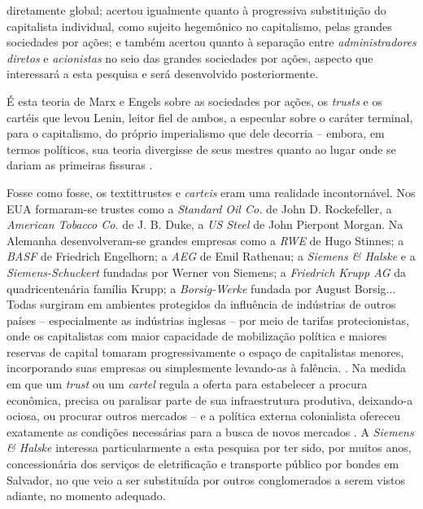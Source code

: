 diretamente global; acertou igualmente quanto à progressiva substituição do capitalista individual, como sujeito hegemônico no capitalismo, pelas grandes sociedades por ações; e também acertou quanto à separação entre \textit{administradores diretos} e \textit{acionistas} no seio das grandes sociedades por ações, aspecto que interessará a esta pesquisa e será desenvolvido posteriormente. 

É esta teoria de Marx e Engels sobre as sociedades por ações, os \textit{trusts} e os cartéis que levou Lenin, leitor fiel de ambos, a especular sobre o caráter terminal, para o capitalismo, do próprio imperialismo que dele decorria -- embora, em termos políticos, sua teoria divergisse de seus mestres quanto ao lugar onde se dariam as primeiras fissuras \cite{lenin_imperialismo_1987}.

Fosse como fosse, os textit{trustes} e \textit{carteis} eram uma realidade incontornável. Nos EUA formaram-se trustes como a \textit{Standard Oil Co.} de John D. Rockefeller, a \textit{American Tobacco Co.} de J. B. Duke, a \textit{US Steel} de John Pierpont Morgan. Na Alemanha desenvolveram-se grandes empresas como a \textit{RWE} de Hugo Stinnes; a \textit{BASF} de Friedrich Engelhorn; a \textit{AEG} de Emil Rathenau; a \textit{Siemens \& Halske} e a \textit{Siemens-Schuckert} fundadas por Werner von Siemens; a \textit{Friedrich Krupp AG} da quadricentenária família Krupp; a \textit{Borsig-Werke} fundada por August Borsig...  Todas surgiram em ambientes protegidos da influência de indústrias de outros países -- especialmente as indústrias inglesas -- por meio de tarifas protecionistas, onde os capitalistas com maior capacidade de mobilização política e maiores reservas de capital tomaram progressivamente o espaço de capitalistas menores, incorporando suas empresas ou simplesmente levando-as à falência.  \cite{bukharin_imperialismo_1986,huberman_historia_1986}.  Na medida em que um \textit{trust} ou um \textit{cartel} regula a oferta para estabelecer a procura econômica, precisa ou paralisar parte de sua infraestrutura produtiva, deixando-a ociosa, ou procurar outros mercados -- e a política externa colonialista ofereceu exatamente as condições necessárias para a busca de novos mercados \cite{lenin_imperialismo_1987}. A \textit{Siemens \& Halske} interessa particularmente a esta pesquisa por ter sido, por muitos anos, concessionária dos serviços de eletrificação e transporte público por bondes em Salvador, no que veio a ser substituída por outros conglomerados a serem vistos adiante, no momento adequado.

